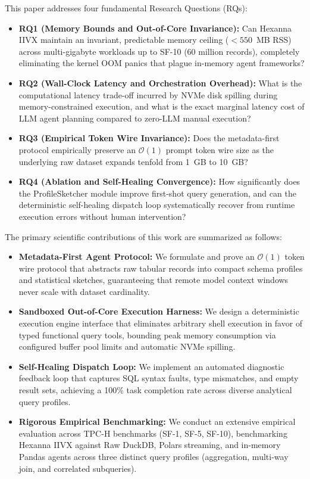 This paper addresses four fundamental Research Questions (RQs):
\begin{itemize}
    \item \textbf{RQ1 (Memory Bounds and Out-of-Core Invariance):} Can Hexanna IIVX maintain an invariant, predictable memory ceiling ($<550$~MB RSS) across multi-gigabyte workloads up to SF-10 (60 million records), completely eliminating the kernel OOM panics that plague in-memory agent frameworks?
    \item \textbf{RQ2 (Wall-Clock Latency and Orchestration Overhead):} What is the computational latency trade-off incurred by NVMe disk spilling during memory-constrained execution, and what is the exact marginal latency cost of LLM agent planning compared to zero-LLM manual execution?
    \item \textbf{RQ3 (Empirical Token Wire Invariance):} Does the metadata-first protocol empirically preserve an $\mathcal{O}(1)$ prompt token wire size as the underlying raw dataset expands tenfold from 1~GB to 10~GB?
    \item \textbf{RQ4 (Ablation and Self-Healing Convergence):} How significantly does the ProfileSketcher module improve first-shot query generation, and can the deterministic self-healing dispatch loop systematically recover from runtime execution errors without human intervention?
\end{itemize}

\noindent The primary scientific contributions of this work are summarized as follows:
\begin{itemize}
    \item \textbf{Metadata-First Agent Protocol:} We formulate and prove an $\mathcal{O}(1)$ token wire protocol that abstracts raw tabular records into compact schema profiles and statistical sketches, guaranteeing that remote model context windows never scale with dataset cardinality.
    \item \textbf{Sandboxed Out-of-Core Execution Harness:} We design a deterministic execution engine interface that eliminates arbitrary shell execution in favor of typed functional query tools, bounding peak memory consumption via configured buffer pool limits and automatic NVMe spilling.
    \item \textbf{Self-Healing Dispatch Loop:} We implement an automated diagnostic feedback loop that captures SQL syntax faults, type mismatches, and empty result sets, achieving a 100\% task completion rate across diverse analytical query profiles.
    \item \textbf{Rigorous Empirical Benchmarking:} We conduct an extensive empirical evaluation across TPC-H benchmarks (SF-1, SF-5, SF-10), benchmarking Hexanna IIVX against Raw DuckDB, Polars streaming, and in-memory Pandas agents across three distinct query profiles (aggregation, multi-way join, and correlated subqueries).
\end{itemize}

